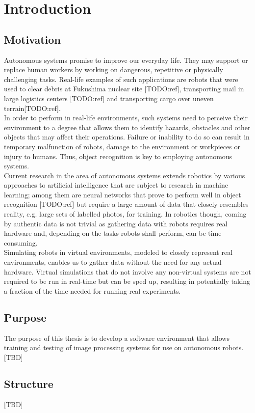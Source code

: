 \chapter{Introduction}

\section{Motivation}
Autonomous systems promise to improve our everyday life. They may support or replace human workers by working on dangerous, repetitive or physically challenging tasks. Real-life examples of such applications are robots that were used to clear debris at Fukushima nuclear site [TODO:ref], transporting mail in large logistics centers [TODO:ref] and transporting cargo over uneven terrain[TODO:ref].\\
In order to perform in real-life environments, such systems need to perceive their environment to a degree that allows them to identify hazards, obstacles and other objects that may affect their operations. Failure or inability to do so can result in temporary malfunction of robots, damage to the environment or workpieces or injury to humans. Thus, object recognition is key to employing autonomous systems.\\
Current research in the area of autonomous systems extends robotics by various approaches to artificial intelligence that are subject to research in machine learning; among them are neural networks that prove to perform well in object recognition [TODO:ref] but require a large amount of data that closely resembles reality, e.g. large sets of labelled photos, for training. In robotics though, coming by authentic data is not trivial as gathering data with robots requires real hardware and, depending on the tasks robots shall perform, can be time consuming.\\
Simulating robots in virtual environments, modeled to closely represent real environments, enables us to gather data without the need for any actual hardware. Virtual simulations that do not involve any non-virtual systems are not required to be run in real-time but can be sped up, resulting in potentially taking a fraction of the time needed for running real experiments.

\section{Purpose}
The purpose of this thesis is to develop a software environment that allows training and testing of image processing systems for use on autonomous robots.
[TBD]

\section{Structure}
[TBD]